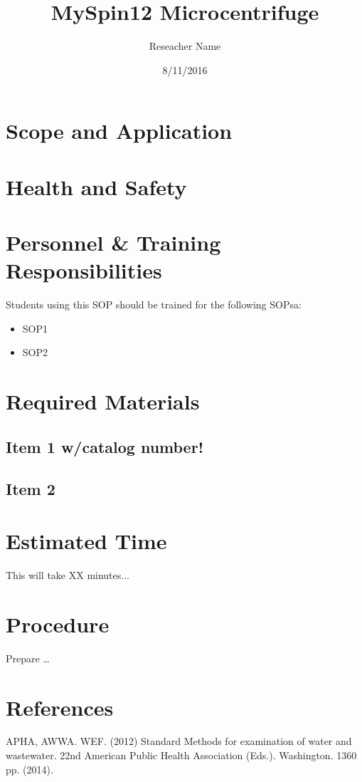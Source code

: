 \documentclass[12pt]{../SOP2}
\title{MySpin12 Microcentrifuge}
\date{8/11/2016}
\author{Reseacher Name}
\begin{document}


\maketitle

\section{Scope and Application}

\NP \blindtext

\NP \lipsum[1]

\section{Health and Safety}

\NP \lipsum[2]


\section{Personnel \& Training Responsibilities}

\NP \lipsum[1]

Students using this SOP should be trained for the following SOPsa:

\begin{itemize}
  \item SOP1
  \item SOP2
\end{itemize}


\section{Required Materials}

\subsection{Item 1 w/catalog number!}
\subsection{Item 2}

\section{Estimated Time}

\NP This will take XX minutes...

\section{Procedure}

\NP Prepare \dots

\NP

\section{References}

\NP APHA, AWWA. WEF. (2012) Standard Methods for examination of water and wastewater. 22nd American Public Health Association (Eds.). Washington. 1360 pp. (2014).
\end{document}
